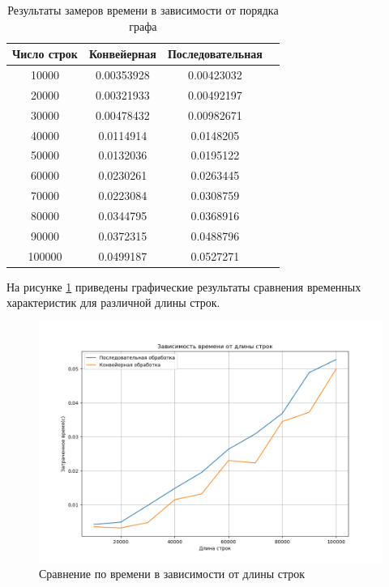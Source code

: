 \begin{table}[h]
    \begin{center}
        \begin{threeparttable}
        \captionsetup{justification=raggedright,singlelinecheck=off}
        \caption{Результаты замеров времени в зависимости от порядка графа}
        \label{tbl:time_len}
        \begin{tabular}{|c|c|c|c|}
            \hline
            Число строк & Конвейерная & Последовательная \\
            \hline
            10000 & 0.00353928 & 0.00423032 \\ \hline  
            20000 & 0.00321933 & 0.00492197 \\ \hline
            30000 & 0.00478432 & 0.00982671 \\ \hline
            40000 & 0.0114914 & 0.0148205  \\ \hline 
            50000 & 0.0132036 & 0.0195122 \\ \hline
            60000 & 0.0230261 & 0.0263445 \\ \hline
            70000 & 0.0223084 & 0.0308759 \\ \hline
            80000 & 0.0344795 & 0.0368916 \\ \hline
            90000 & 0.0372315 & 0.0488796 \\ \hline
            100000 & 0.0499187 & 0.0527271 \\ \hline                                           
		\end{tabular}
    \end{threeparttable}
\end{center}
\end{table}

На рисунке \ref{img:len} приведены графические результаты сравнения временных характеристик для различной длины строк.

\begin{figure}[H]
	\begin{center}
		\includegraphics[scale=0.5]{img/len.png}
	\end{center}
	\captionsetup{justification=centering}
	\caption{Сравнение по времени в зависимости от длины строк}
	\label{img:len}
\end{figure}

